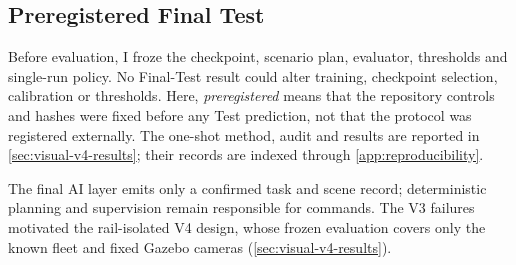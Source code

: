 \subsection{Preregistered Final Test}

Before evaluation, I froze the checkpoint, scenario plan, evaluator, thresholds
and single-run policy. No Final-Test result could alter training, checkpoint
selection, calibration or thresholds. Here, \emph{preregistered} means that the
repository controls and hashes were fixed before any Test prediction, not that
the protocol was registered externally. The one-shot method, audit and results
are reported in \cref{sec:visual-v4-results}; their records are indexed through
\cref{app:reproducibility}.

The final AI layer emits only a confirmed task and scene record; deterministic
planning and supervision remain responsible for commands. The V3 failures
motivated the rail-isolated V4 design, whose frozen evaluation covers only the
known fleet and fixed Gazebo cameras (\cref{sec:visual-v4-results}).
